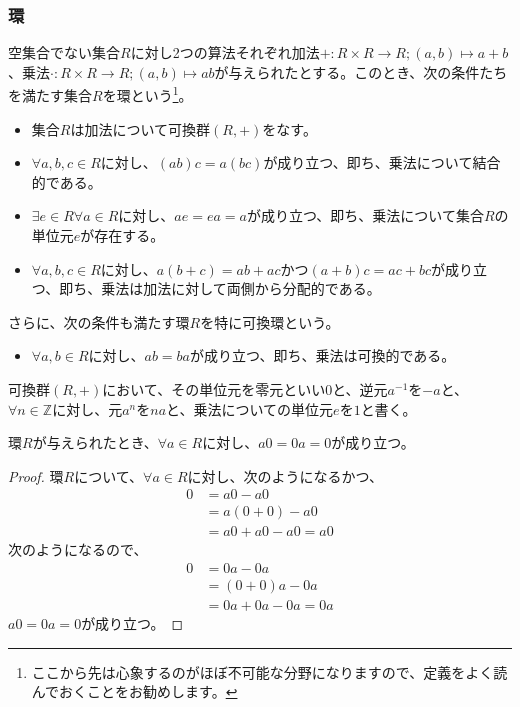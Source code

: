 \documentclass[dvipdfmx]{jsarticle}
\begin{document}
\subsubsection{環}%
\begin{axs}[環の公理]
空集合でない集合$R$に対し2つの算法それぞれ加法$+ :R \times R \rightarrow R;(a,b) \mapsto a + b$、乗法$\cdot :R \times R \rightarrow R;(a,b) \mapsto ab$が与えられたとする。このとき、次の条件たちを満たす集合$R$を環という\footnote{ここから先は心象するのがほぼ不可能な分野になりますので、定義をよく読んでおくことをお勧めします。}。
\begin{itemize}
\item
  集合$R$は加法について可換群$(R, + )$をなす。
\item
  $\forall a,b,c \in R$に対し、$(ab)c = a(bc)$が成り立つ、即ち、乗法について結合的である。
\item
  $\exists e \in R\forall a \in R$に対し、$ae = ea = a$が成り立つ、即ち、乗法について集合$R$の単位元$e$が存在する。
\item
  $\forall a,b,c \in R$に対し、$a(b + c) = ab + ac$かつ$(a + b)c = ac + bc$が成り立つ、即ち、乗法は加法に対して両側から分配的である。
\end{itemize}
さらに、次の条件も満たす環$R$を特に可換環という。
\begin{itemize}
\item
  $\forall a,b \in R$に対し、$ab = ba$が成り立つ、即ち、乗法は可換的である。
\end{itemize}
\end{axs}
\begin{dfn}
可換群$(R, + )$において、その単位元を零元といい$0$と、逆元$a^{- 1}$を$- a$と、$\forall n \in \mathbb{Z}$に対し、元$a^{n}$を$na$と、乗法についての単位元$e$を$1$と書く。
\end{dfn}
\begin{thm}\label{2.1.1.5}
環$R$が与えられたとき、$\forall a \in R$に対し、$a0 = 0a = 0$が成り立つ。
\end{thm}
\begin{proof} 環$R$について、$\forall a \in R$に対し、次のようになるかつ、
\begin{align*}
0 &= a0 - a0\\
&= a(0 + 0) - a0\\
&= a0 + a0 - a0 = a0
\end{align*}
次のようになるので、
\begin{align*}
0 &= 0a - 0a\\
&= (0 + 0)a - 0a\\
&= 0a + 0a - 0a = 0a
\end{align*}
$a0 = 0a = 0$が成り立つ。
\end{proof}
\end{document}
